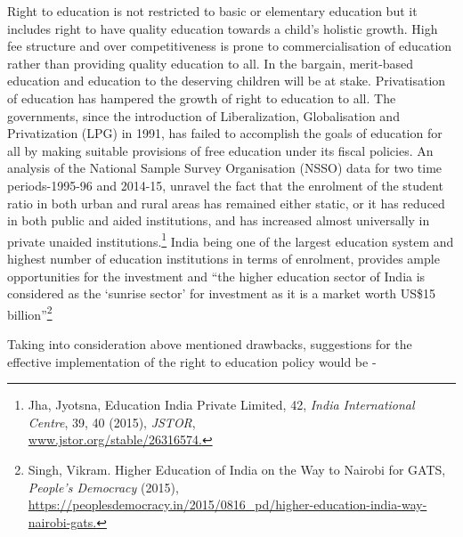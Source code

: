 \begin{multicols}{2}



\noi
Right to education is not restricted to basic or elementary education but it includes right to
have quality education towards a child’s holistic growth. High fee structure and over
competitiveness is prone to commercialisation of education rather than providing quality
education to all. In the bargain, merit-based education and education to the deserving children
will be at stake. Privatisation of education has hampered the growth of right to education to
all. The governments, since the introduction of Liberalization, Globalisation and Privatization
(LPG) in 1991, has failed to accomplish the goals of education for all by making suitable
provisions of free education under its fiscal policies. An analysis of the National Sample
Survey Organisation (NSSO) data for two time periods-1995-96 and 2014-15, unravel the
fact that the enrolment of the student ratio in both urban and rural areas has remained either
static, or it has reduced in both public and aided institutions, and has increased almost
universally in private unaided institutions.\footnote{Jha, Jyotsna, Education India Private Limited, 42, \textit{India International Centre}, 39, 40 (2015), \textit{JSTOR},\\ \url{www.jstor.org/stable/26316574.}} India being one of the largest education system and highest number of education institutions in terms of enrolment, provides ample
opportunities for the investment and “the higher education sector of India is considered as the
‘sunrise sector’ for investment as it is a market worth US\$15 billion”\footnote{Singh, Vikram. Higher Education of India on the Way to Nairobi for GATS, \textit{People’s Democracy} (2015),\\ \url{https://peoplesdemocracy.in/2015/0816_pd/higher-education-india-way-nairobi-gats.}}





\noi
Taking into consideration above mentioned drawbacks, suggestions for the effective
implementation of the right to education policy would be -


\end{multicols}
